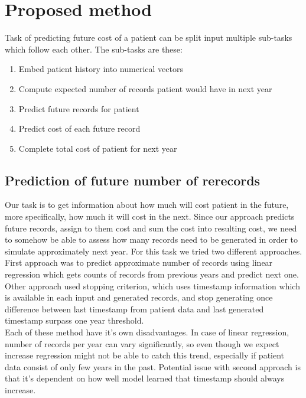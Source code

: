 
\chapter{Proposed method}

Task of predicting future cost of a patient can be split input multiple sub-tasks which follow each other. The sub-tasks are these:

\begin{enumerate}
	\item Embed patient history into numerical vectors
	\item Compute expected number of records patient would have in next year
	\item Predict future records for patient
	\item Predict cost of each future record
	\item Complete total cost of patient for next year
\end{enumerate}




\section{Prediction of future number of rerecords}

Our task is to get information about how much will cost patient in the future, more specifically, how much it will cost in the next. Since our approach predicts future records, assign to them cost and sum the cost into resulting cost, we need to somehow be able to assess how many records need to be generated in order to simulate approximately next year. For this task we tried two different approaches.
\\

First approach was to predict approximate number of records using linear regression which gets counts of records from previous years and predict next one. Other approach used stopping criterion, which uses timestamp information which is available in each input and generated records, and stop generating once difference between last timestamp from patient data and last generated timestamp surpass one year threshold.
\\

Each of these method have it's own disadvantages. In case of linear regression, number of records per year can vary significantly, so even though we expect increase \cite{num_of_vis} regression might not be able to catch this trend, especially if patient data consist of only few years in the past. Potential issue with second approach is that it's dependent on how well model learned that timestamp should always increase.  

